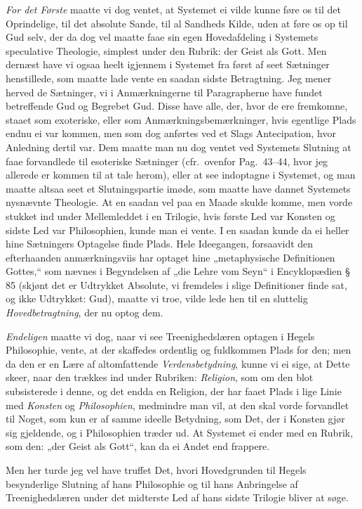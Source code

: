 \documentclass[12pt,a4paper]{book}
\newcommand{\apage}[1]{\marginnote{\footnotesize\textit{[#1]}}}
\begin{document}
\emph{For det Første} maatte vi dog ventet, at Systemet ei vilde kunne føre os til det
Oprindelige, til det absolute Sande, til al Sandheds Kilde, uden at føre os op til
Gud selv, der da dog vel maatte faae sin egen Hovedafdeling i Systemets
speculative Theologie, simplest under den Rubrik: der Geist als Gott. Men dernæst
have vi ogsaa heelt igjennem i Systemet fra først af seet Sætninger henstillede,
som maatte lade vente en saadan sidste Betragtning. Jeg mener herved de Sætninger,
vi i Anmærkningerne til Paragrapherne have fundet betreffende Gud og Begrebet Gud.
Disse have alle, der, hvor de ere fremkomne, staaet som exoteriske, eller som
Anmærkningsbemærkninger, hvis egentlige Plads endnu ei var kommen, men som dog
anførtes ved et Slags Antecipation, hvor Anledning dertil var. Dem maatte man nu
dog ventet ved Systemets Slutning at faae forvandlede til esoteriske Sætninger
(cfr.\ ovenfor Pag.\ 43--44, hvor jeg allerede er kommen til at tale herom), eller
at see indoptagne i Systemet, og man maatte altsaa seet et Slutningspartie imøde,
som maatte have dannet Systemets nysnævnte Theologie. At en saadan vel paa en
Maade skulde komme, men vorde stukket ind under Mellemleddet i en Trilogie, hvis
første Led var Konsten og sidste Led var Philosophien, kunde man ei vente. I en
saadan kunde da ei heller hine \apage{149} Sætningers Optagelse finde Plads. Hele Ideegangen,
forsaavidt den efterhaanden anmærkningsviis har optaget hine „metaphysische
Definitionen Gottes,“ som nævnes i Begyndelsen af „die Lehre vom Seyn“ i
Encyklopædien § 85 (skjønt det er Udtrykket Absolute, vi fremdeles i slige
Definitioner finde sat, og ikke Udtrykket: Gud), maatte vi troe, vilde lede hen
til en sluttelig \emph{Hovedbetragtning}, der nu optog dem.

\emph{Endeligen} maatte vi dog, naar vi see Treenighedslæren optagen i Hegels
Philosophie, vente, at der skaffedes ordentlig og fuldkommen Plads for den; men da
den er en Lære af altomfattende \emph{Verdensbetydning}, kunne vi ei sige, at Dette skeer,
naar den trækkes ind under Rubriken: \emph{Religion}, som om den blot subsisterede i
denne, og det endda en Religion, der har faaet Plads i lige Linie med \emph{Konsten} og
\emph{Philosophien}, medmindre man vil, at den skal vorde forvandlet til Noget, som kun
er af samme ideelle Betydning, som Det, der i Konsten gjør sig gjeldende, og i
Philosophien træder ud. At Systemet ei ender med en Rubrik, som den: „der Geist
als Gott“, kan da ei Andet end frappere.

Men her turde jeg vel have truffet Det, hvori Hovedgrunden til Hegels besynderlige
Slutning af hans Philosophie og til hans Anbringelse af Treenighedslæren under det
midterste Led af hans sidste Trilogie bliver at søge.
\end{document}
